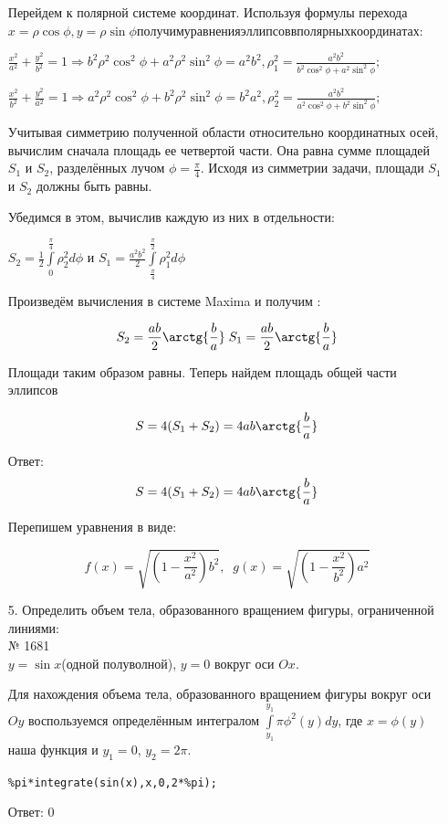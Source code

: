 \documentclass[article, bachelor, och, pract]{SCWorks}
\begin{document}
\begin{itemize}
Перейдем к полярной системе координат. Используя формулы перехода $x=\rho\cos{\phi}, y=\rho\sin{\phi} получим уравнения эллипсов в полярных координатах:$

$\frac{x^2}{a^2}+\frac{y^2}{b^2}=1 \Rightarrow b^2\rho^2\cos^2{\phi}+a^2\rho^2\sin^2{\phi}=a^2b^2, \rho_1^2=\frac{a^2b^2}{b^2\cos^2{\phi}+a^2\sin^2{\phi}};$

$\frac{x^2}{b^2}+\frac{y^2}{a^2}=1 \Rightarrow a^2\rho^2\cos^2{\phi}+b^2\rho^2\sin^2{\phi}=b^2a^2, \rho_2^2=\frac{a^2b^2}{a^2\cos^2{\phi}+b^2\sin^2{\phi}};$

Учитывая симметрию полученной области относительно координатных осей, вычислим сначала площадь ее четвертой части. Она равна сумме площадей $S_1$ и $S_2$, разделённых лучом $\phi=\frac{\pi}{4}$. Исходя из симметрии задачи, площади $S_1$ и $S_2$ должны быть равны. 

Убедимся в этом, вычислив каждую из них в отдельности:

$S_2=\frac{1}{2}\int\limits_{0}^{\frac{\pi}{4}} \rho_2^2d\phi$
и
$S_1=\frac{a^2b^2}{2}\int\limits_{\frac{\pi}{4}}^{\frac{\pi}{2}} \rho_1^2d\phi$

Произведём вычисления в системе Maxima и получим : 

$$S_2=\frac{ab}{2}\arctg{\frac{b}{a}} \; S_1=\frac{ab}{2}\arctg{\frac{b}{a}}$$

Площади таким образом равны. Теперь найдем площадь общей части эллипсов

$$S=4(S_1+S_2)=4ab\arctg{\frac{b}{a}}$$

Ответ: $$S=4(S_1+S_2)=4ab\arctg{\frac{b}{a}}$$

\newpage
Перепишем уравнения в виде:

$$f(x)=\sqrt{(1-\frac{x^2}{a^2})b^2}, \;\; g(x)=\sqrt{(1-\frac{x^2}{b^2})a^2 }$$

\item[5.] Определить объем тела, образованного вращением фигуры, ограниченной линиями:\\

№ 1681 \\
$y = \sin{x}$(одной полуволной), $y=0$ вокруг оси $Ox$.

Для нахождения объема тела, образованного вращением фигуры вокруг оси $Oy$ воспользуемся определённым интегралом $\int\limits_{y_1}^{y_1} \pi \phi^2(y)dy$, где $x=\phi(y)$ наша функция и $y_1=0$, $y_2=2\pi$.

\texttt{\%pi*integrate(sin(x),x,0,2*\%pi);}

Ответ: $0$

\end{itemize}
\end{document}
